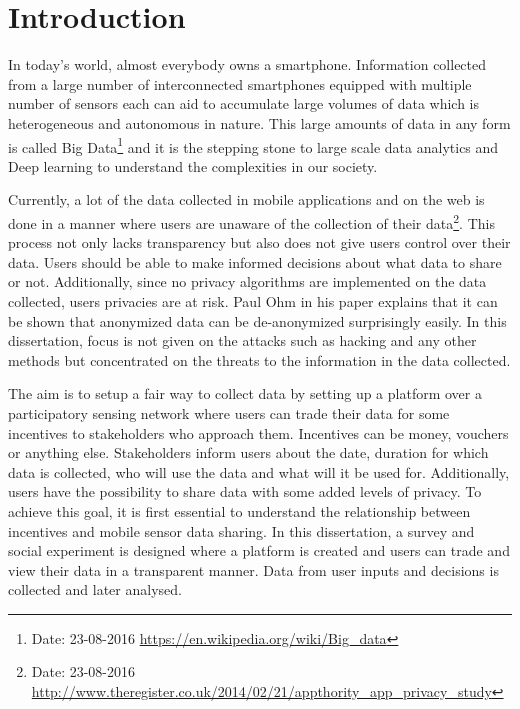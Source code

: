 \chapter{Introduction}

In today's world, almost everybody owns a smartphone. Information collected from a large number of interconnected smartphones equipped with
multiple number of sensors each can aid to accumulate large volumes of data which is heterogeneous and autonomous in nature. This large amounts of data in any form is called Big Data\footnote{Date: 23-08-2016 \url{https://en.wikipedia.org/wiki/Big\_data}} and it
is the stepping stone to large scale data analytics and Deep learning to understand the complexities in our society. 

Currently, a lot of the data collected in mobile applications and on the web
is done in a manner where users are unaware of the collection of their data\footnote{Date: 23-08-2016 \url{http://www.theregister.co.uk/2014/02/21/appthority\_app_privacy\_study}}. This process not only lacks transparency but also does not give users
control over their data. Users should be able to make informed decisions about what data to share or not. Additionally, since no privacy algorithms 
are implemented on the data collected, users privacies are at risk. Paul Ohm in his paper \cite{ohm2010broken} explains that it can be shown that anonymized data can be de-anonymized surprisingly easily. In this dissertation, focus is not given on the attacks such as hacking and any other methods but concentrated on the threats to the information in the data collected.

The aim is to setup a fair way to collect data by setting up a platform over a participatory sensing network where users can trade their data for some incentives to stakeholders who approach them.
Incentives can be money, vouchers or anything else. Stakeholders inform users about the date, duration for which data is collected, who will use the data and what will it be used for. Additionally, users have the possibility to share data with some added levels of privacy. 
To achieve this goal, it is first essential to understand the relationship between incentives and mobile sensor data sharing. In this dissertation, a survey and social experiment is designed where a platform is created and users can trade and view their data in a transparent manner. Data from user inputs and decisions is collected and later analysed.







